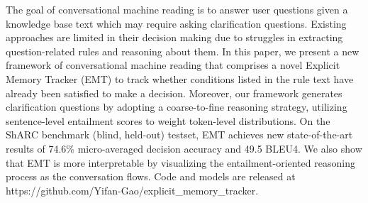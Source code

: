 The goal of conversational machine reading is to answer user questions given a knowledge base text which may require asking clarification questions. Existing approaches are limited in their decision making due to struggles in extracting question-related rules and reasoning about them. In this paper, we present a new framework of conversational machine reading that comprises a novel Explicit Memory Tracker (EMT) to track whether conditions listed in the rule text have already been satisfied to make a decision. Moreover, our framework generates clarification questions by adopting a coarse-to-fine reasoning strategy, utilizing sentence-level entailment scores to weight token-level distributions. On the ShARC  benchmark (blind, held-out) testset, EMT achieves new state-of-the-art results of 74.6\% micro-averaged decision accuracy and 49.5 BLEU4. We also show that EMT is more interpretable by visualizing the entailment-oriented reasoning process as the conversation flows. Code and models are released at https://github.com/Yifan-Gao/explicit\_memory\_tracker.
